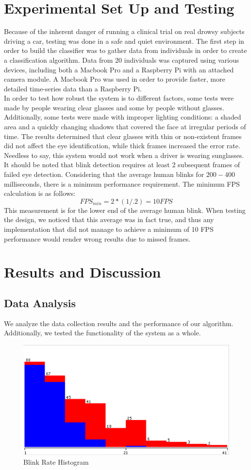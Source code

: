 \documentclass[twocolumn]{article}
\begin{document}
\section{Experimental Set Up and Testing}
Because of the inherent danger of running a clinical trial on real drowsy subjects driving a car, testing was done in a safe and quiet environment.  The first step in order to build the classifier was to gather data from individuals in order to create a classification algorithm. Data from 20 individuals was captured using various devices, including both a Macbook Pro and a Raspberry Pi with an attached camera module. A Macbook Pro was used in order to provide faster, more detailed time-series data than a Raspberry Pi.  \\
In order to test how robust the system is to different factors, some tests were made by people wearing clear glasses and some by people without glasses. Additionally, some tests were made with improper lighting conditions: a shaded area and a quickly changing shadows that covered the face at irregular periods of time. The results determined that clear glasses with thin or non-existent frames did not affect the eye identification, while thick frames increased the error rate. Needless to say, this system would not work when a driver is wearing sunglasses. 
It should be noted that blink detection requires at least 2 subsequent frames of failed eye detection. Considering that the average human blinks for $200-400$ milliseconds, there is a minimum performance requirement. The minimum FPS calculation is as follows:
$$FPS_{min} = 2*(1/.2) = 10 FPS$$ 
This measurement is for the lower end of the average human blink. When testing the design, we noticed that this average was in fact true, and thus any implementation that did not manage to achieve a minimum of 10 FPS performance would render wrong results due to missed frames. \\

\section{Results and Discussion}
\subsection{Data Analysis}
We analyze the data collection results and the performance of our algorithm. Additionally, we tested the functionality of the system as a whole. 
\begin{figure}[H]
\centering
\includegraphics[width=0.8\linewidth]{./blink_rate.png}
\caption{Blink Rate Histogram }
\label{fig:blink_hist}
\end{figure}
\end{document}
